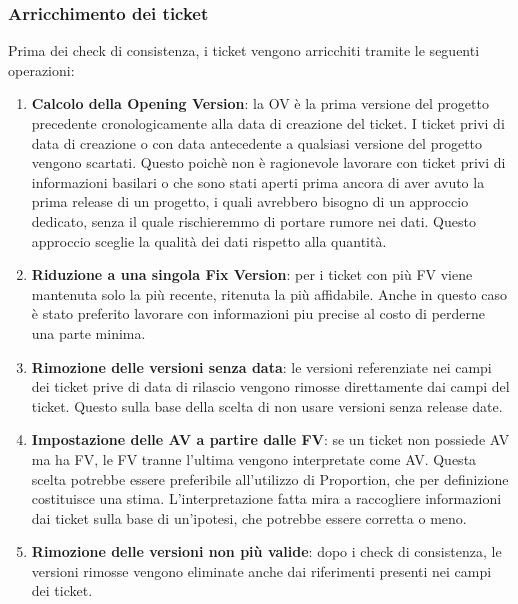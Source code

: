 \subsubsection{Arricchimento dei ticket}

Prima dei check di consistenza, i ticket vengono arricchiti tramite le seguenti operazioni:

\begin{enumerate}
    \item \textbf{Calcolo della Opening Version}: la OV è la prima versione del progetto
    precedente cronologicamente alla data di creazione del ticket. I ticket privi di data
    di creazione o con data antecedente a qualsiasi versione del progetto vengono scartati. Questo poichè non è ragionevole lavorare con ticket privi di informazioni basilari o che sono stati aperti prima ancora di aver avuto la prima release di un progetto, i quali avrebbero bisogno di un approccio dedicato, senza il quale rischieremmo di portare rumore nei dati. Questo approccio sceglie la qualità dei dati rispetto alla quantità.

    \item \textbf{Riduzione a una singola Fix Version}: per i ticket con più FV viene
    mantenuta solo la più recente, ritenuta la più affidabile. Anche in questo caso è stato preferito lavorare con informazioni piu precise al costo di perderne una parte minima.

    \item \textbf{Rimozione delle versioni senza data}: le versioni referenziate nei campi
    dei ticket prive di data di rilascio vengono rimosse direttamente dai campi del ticket. Questo sulla base della scelta di non usare versioni senza release date.

    \item \textbf{Impostazione delle AV a partire dalle FV}: se un ticket non possiede AV
    ma ha FV, le FV tranne l'ultima vengono interpretate come AV. Questa scelta potrebbe essere
    preferibile all'utilizzo di Proportion, che per definizione costituisce una stima. L'interpretazione fatta mira a raccogliere informazioni dai ticket sulla base di un'ipotesi, che potrebbe essere corretta o meno.

    \item \textbf{Rimozione delle versioni non più valide}: dopo i check di consistenza,
    le versioni rimosse vengono eliminate anche dai riferimenti presenti nei campi dei
    ticket.
\end{enumerate}

